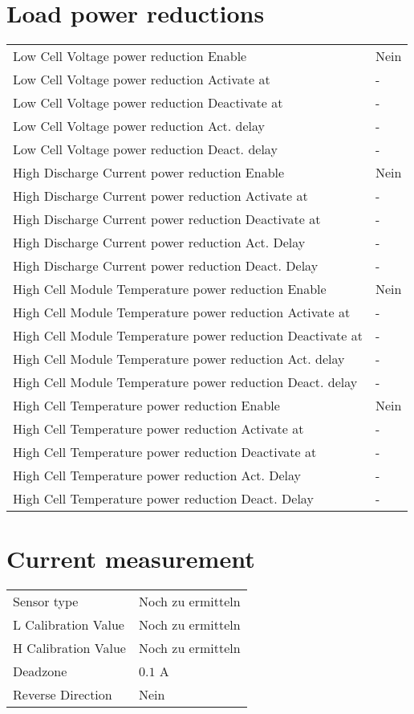 \section*{Load power reductions}
\begin{tabular}{p{11cm}p{2cm}}
	Low Cell Voltage power reduction Enable & Nein \\
	Low Cell Voltage power reduction Activate at & - \\
	Low Cell Voltage power reduction Deactivate at & - \\
	Low Cell Voltage power reduction Act. delay & - \\
	Low Cell Voltage power reduction Deact. delay & - \\
	High Discharge Current power reduction Enable & Nein \\
	High Discharge Current power reduction Activate at & - \\
	High Discharge Current power reduction Deactivate at & - \\
	High Discharge Current power reduction Act. Delay & - \\
	High Discharge Current power reduction Deact. Delay & - \\
	High Cell Module Temperature power reduction Enable & Nein \\
	High Cell Module Temperature power reduction Activate at & - \\
	High Cell Module Temperature power reduction Deactivate at & - \\
	High Cell Module Temperature power reduction Act. delay & - \\
	High Cell Module Temperature power reduction Deact. delay & - \\
	High Cell Temperature power reduction Enable & Nein \\
	High Cell Temperature power reduction Activate at & - \\
	High Cell Temperature power reduction Deactivate at & - \\
	High Cell Temperature power reduction Act. Delay & - \\
	High Cell Temperature power reduction Deact. Delay & - \\
\end{tabular}

\section*{Current measurement}
\begin{tabular}{p{11cm}p{4cm}}
	Sensor type & Noch zu ermitteln \\
	L Calibration Value & Noch zu ermitteln \\
	H Calibration Value & Noch zu ermitteln \\
	Deadzone & $0.1$ A \\
	Reverse Direction & Nein
\end{tabular}

